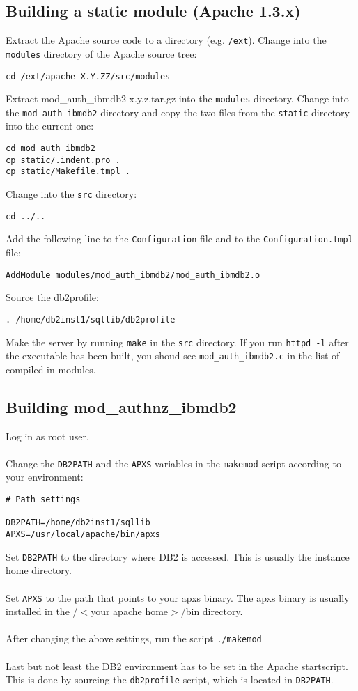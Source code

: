 \documentclass[11pt,a4paper]{article}
\begin{document}
\subsection{Building a static module (Apache 1.3.x)}
Extract the Apache source code to a directory (e.g. {\tt /ext}). Change into the {\tt modules} directory of the Apache source tree:
\begin{verbatim}
cd /ext/apache_X.Y.ZZ/src/modules
\end{verbatim}
Extract mod\_auth\_ibmdb2-x.y.z.tar.gz into the {\tt modules} directory. Change into the {\tt mod\_auth\_ibmdb2} directory and copy the two files from the {\tt static} directory into the current one:
\begin{verbatim}
cd mod_auth_ibmdb2
cp static/.indent.pro .
cp static/Makefile.tmpl .
\end{verbatim}
Change into the {\tt src} directory:
\begin{verbatim}
cd ../..
\end{verbatim}
Add the following line to the {\tt Configuration} file and to the {\tt Configuration.tmpl} file:
\begin{verbatim}
AddModule modules/mod_auth_ibmdb2/mod_auth_ibmdb2.o
\end{verbatim}
Source the db2profile:
\begin{verbatim}
. /home/db2inst1/sqllib/db2profile
\end{verbatim}
Make the server by running {\tt make} in the {\tt src} directory. If you run {\tt httpd -l} after the executable has been built, you shoud see {\tt mod\_auth\_ibmdb2.c} in the list of compiled in modules.

\subsection{Building mod\_authnz\_ibmdb2}
Log in as root user.\\
\\
Change the {\tt DB2PATH} and the {\tt APXS} variables in the {\tt makemod} script according to your environment:
\begin{verbatim}
# Path settings

DB2PATH=/home/db2inst1/sqllib
APXS=/usr/local/apache/bin/apxs
\end{verbatim}
Set {\tt DB2PATH} to the directory where DB2 is accessed. This is usually the instance home directory.\\
\\
Set {\tt APXS} to the path that points to your apxs binary. The apxs binary is usually installed in the /$<$your apache home$>$/bin directory.\\
\\
After changing the above settings, run the script {\tt ./makemod}\\
\\
Last but not least the DB2 environment has to be set in the Apache startscript. This is done by sourcing the {\tt db2profile} script, which is located in {\tt DB2PATH}.\\
\end{document}
